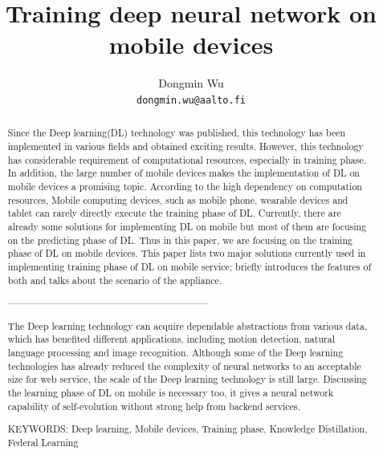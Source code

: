\documentclass[article]{aaltoseries}
\begin{document}
 

\title{Training deep neural network on mobile devices}

\author{Dongmin Wu
\\\textnormal{\texttt{dongmin.wu@aalto.fi}}} %


\maketitle


\begin{abstract}


  Since the Deep learning(DL) technology was published, this technology has been
  implemented in various fields and obtained exciting results. 
  However, this technology has considerable requirement of computational resources, especially
  in training phase. In addition, the large number of mobile devices makes the implementation
  of DL on mobile devices a promising topic. 
 According to the high dependency on computation resources,
 Mobile computing devices, such as mobile phone,
  wearable devices and tablet can rarely directly execute the training phase of DL. 
 Currently, there are already some solutions for implementing DL on mobile\cite{Ota:2017}
 but most of them are focusing on the predicting phase of DL. 
 Thus in this paper, we are focusing on the training phase of DL on mobile devices.
 This paper lists two major solutions currently used in implementing training phase of DL on mobile service;
 briefly introduces the features of both and talks about the scenario of the appliance. 

 ---------------------------------------------------------------
 
  The Deep learning technology can acquire 
  dependable abstractions from various data, which has benefited different applications, 
  including motion detection, natural language processing and image recognition. 
  Although some of the Deep learning technologies 
  has already reduced the complexity of neural networks to an acceptable size for web service, the 
 scale of the Deep learning technology is still large. 
 Discussing the learning phase of DL on mobile is necessary too, 
 it gives a neural network capability of self-evolution without strong help from backend services.



\vspace{3mm}
\noindent KEYWORDS: Deep learning, Mobile devices, Training phase, Knowledge Distillation, Federal Learning

\end{abstract}
\end{document}
